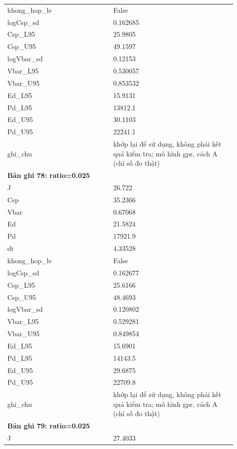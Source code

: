 \begin{longtable}{p{0.43\linewidth}p{0.50\linewidth}}
khong\_\allowbreak hop\_\allowbreak le & False \\
logCsp\_\allowbreak sd & 0.162685 \\
Csp\_\allowbreak L95 & 25.9805 \\
Csp\_\allowbreak U95 & 49.1597 \\
logVbar\_\allowbreak sd & 0.12153 \\
Vbar\_\allowbreak L95 & 0.530057 \\
Vbar\_\allowbreak U95 & 0.853532 \\
Ed\_\allowbreak L95 & 15.9131 \\
Pd\_\allowbreak L95 & 13812.1 \\
Ed\_\allowbreak U95 & 30.1103 \\
Pd\_\allowbreak U95 & 22241.1 \\
ghi\_\allowbreak chu & khớp lại để sử dụng, không phải kết quả kiểm tra; mô hình gpr, cách A (chỉ số đo thật) \\
\midrule
\multicolumn{2}{p{0.95\linewidth}}{\textbf{Bản ghi 78: ratio=0.025}} \\
J & 26.722 \\
Csp & 35.2366 \\
Vbar & 0.67068 \\
Ed & 21.5824 \\
Pd & 17921.9 \\
dt & 4.33528 \\
khong\_\allowbreak hop\_\allowbreak le & False \\
logCsp\_\allowbreak sd & 0.162677 \\
Csp\_\allowbreak L95 & 25.6166 \\
Csp\_\allowbreak U95 & 48.4693 \\
logVbar\_\allowbreak sd & 0.120802 \\
Vbar\_\allowbreak L95 & 0.529281 \\
Vbar\_\allowbreak U95 & 0.849854 \\
Ed\_\allowbreak L95 & 15.6901 \\
Pd\_\allowbreak L95 & 14143.5 \\
Ed\_\allowbreak U95 & 29.6875 \\
Pd\_\allowbreak U95 & 22709.8 \\
ghi\_\allowbreak chu & khớp lại để sử dụng, không phải kết quả kiểm tra; mô hình gpr, cách A (chỉ số đo thật) \\
\midrule
\multicolumn{2}{p{0.95\linewidth}}{\textbf{Bản ghi 79: ratio=0.025}} \\
J & 27.4033 \\

\end{longtable}
